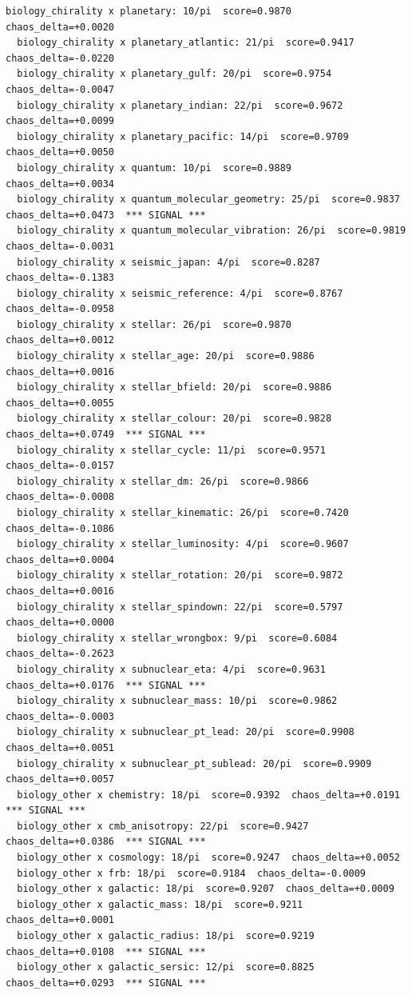 \documentclass[11pt, letterpaper, openany]{book}
\begin{document}
\begin{empiricalbox}
\begin{lstlisting}[style=terminal]
  biology_chirality x planetary: 10/pi  score=0.9870  chaos_delta=+0.0020
  biology_chirality x planetary_atlantic: 21/pi  score=0.9417  chaos_delta=-0.0220
  biology_chirality x planetary_gulf: 20/pi  score=0.9754  chaos_delta=-0.0047
  biology_chirality x planetary_indian: 22/pi  score=0.9672  chaos_delta=+0.0099
  biology_chirality x planetary_pacific: 14/pi  score=0.9709  chaos_delta=+0.0050
  biology_chirality x quantum: 10/pi  score=0.9889  chaos_delta=+0.0034
  biology_chirality x quantum_molecular_geometry: 25/pi  score=0.9837  chaos_delta=+0.0473  *** SIGNAL ***
  biology_chirality x quantum_molecular_vibration: 26/pi  score=0.9819  chaos_delta=-0.0031
  biology_chirality x seismic_japan: 4/pi  score=0.8287  chaos_delta=-0.1383
  biology_chirality x seismic_reference: 4/pi  score=0.8767  chaos_delta=-0.0958
  biology_chirality x stellar: 26/pi  score=0.9870  chaos_delta=+0.0012
  biology_chirality x stellar_age: 20/pi  score=0.9886  chaos_delta=+0.0016
  biology_chirality x stellar_bfield: 20/pi  score=0.9886  chaos_delta=+0.0055
  biology_chirality x stellar_colour: 20/pi  score=0.9828  chaos_delta=+0.0749  *** SIGNAL ***
  biology_chirality x stellar_cycle: 11/pi  score=0.9571  chaos_delta=-0.0157
  biology_chirality x stellar_dm: 26/pi  score=0.9866  chaos_delta=-0.0008
  biology_chirality x stellar_kinematic: 26/pi  score=0.7420  chaos_delta=-0.1086
  biology_chirality x stellar_luminosity: 4/pi  score=0.9607  chaos_delta=+0.0004
  biology_chirality x stellar_rotation: 20/pi  score=0.9872  chaos_delta=+0.0016
  biology_chirality x stellar_spindown: 22/pi  score=0.5797  chaos_delta=+0.0000
  biology_chirality x stellar_wrongbox: 9/pi  score=0.6084  chaos_delta=-0.2623
  biology_chirality x subnuclear_eta: 4/pi  score=0.9631  chaos_delta=+0.0176  *** SIGNAL ***
  biology_chirality x subnuclear_mass: 10/pi  score=0.9862  chaos_delta=-0.0003
  biology_chirality x subnuclear_pt_lead: 20/pi  score=0.9908  chaos_delta=+0.0051
  biology_chirality x subnuclear_pt_sublead: 20/pi  score=0.9909  chaos_delta=+0.0057
  biology_other x chemistry: 18/pi  score=0.9392  chaos_delta=+0.0191  *** SIGNAL ***
  biology_other x cmb_anisotropy: 22/pi  score=0.9427  chaos_delta=+0.0386  *** SIGNAL ***
  biology_other x cosmology: 18/pi  score=0.9247  chaos_delta=+0.0052
  biology_other x frb: 18/pi  score=0.9184  chaos_delta=-0.0009
  biology_other x galactic: 18/pi  score=0.9207  chaos_delta=+0.0009
  biology_other x galactic_mass: 18/pi  score=0.9211  chaos_delta=+0.0001
  biology_other x galactic_radius: 18/pi  score=0.9219  chaos_delta=+0.0108  *** SIGNAL ***
  biology_other x galactic_sersic: 12/pi  score=0.8825  chaos_delta=+0.0293  *** SIGNAL ***

\end{lstlisting}
\end{empiricalbox}
\end{document}
